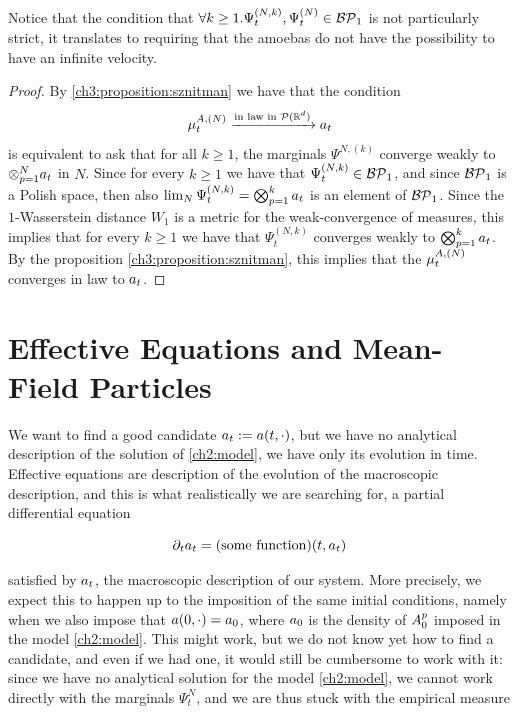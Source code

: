 \begin{remark}
	Notice that the condition that $\forall k\geq 1. \Psi_t^{(N,k)},\Psi_t^{(N)} \in \mathcal{BP}_1$ is not particularly strict, it translates to requiring that the amoebas do not have the possibility to have an infinite velocity.
\end{remark}

\begin{proof}
	By \ref{ch3:proposition:sznitman} we have that the condition
	\begin{equation*}
		\mu_t^{A,(N)}\xrightarrow{\text{in law in $\mathcal{P}(\mathbb{R}^d)$}} a_t
	\end{equation*}
	is equivalent to ask that for all $k \geq 1$, the marginals $\Psi^{N, (k)}$ converge weakly to $ \otimes_{p=1}^N a_t$ in $N$.
	Since for every $k\geq 1$ we have that $\Psi_t^{(N,k)} \in \mathcal{BP}_1$, and since $\mathcal{BP}_1$ is a Polish space, then also $\lim_N \Psi_t^{(N,k)} = \bigotimes_{p=1}^{k} a_t$  is an element of $\mathcal{BP}_1$.
	Since the $1$-Wasserstein distance $W_1$ is a metric for the weak-convergence of measures, this implies that for every $k\geq 1$ we have that $\Psi_t^{(N,k)}$ converges weakly to $\bigotimes_{p=1}^{k} a_t$.
	By the proposition \ref{ch3:proposition:sznitman}, this implies that the \rv $\mu_t^{A,(N)}$ converges in law to $a_t$.
\end{proof}

\section{Effective Equations and Mean-Field Particles}

We want to find a good candidate $a_t := a(t, \cdot)$, but we have no analytical description of the solution of \ref{ch2:model}, we have only its evolution in time.
Effective equations are description of the evolution of the macroscopic description, and this is what realistically we are searching for, \ie a partial differential equation

\begin{equation*}
	\partial_t a_t = (\text{some function}) (t, a_t)
\end{equation*}

satisfied by $a_t$, the macroscopic description of our system.
More precisely, we expect this to happen up to the imposition of the same initial conditions, namely when we also impose that $a(0, \cdot) = a_0$, where $a_0$ is the density of $A_0^p$ imposed in the model \ref{ch2:model}.
This might work, but we do not know yet how to find a candidate, and even if we had one, it would still be cumbersome to work with it:
since we have no analytical solution for the model \ref{ch2:model}, we cannot work directly with the marginals $\Psi_t^N$, and we are thus stuck with the empirical measure

